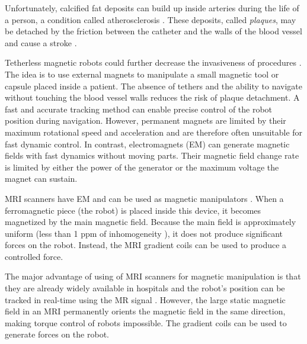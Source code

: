  
 Unfortunately, calcified fat deposits can build up inside arteries during the life of a person, a condition called atherosclerosis \cite{suri2010atherosclerosis}. 
 These deposits, called \emph{plaques}, may be detached by the friction between the catheter and the walls of the blood vessel and cause a stroke \cite{khatri2006ischemic,hamon2008periprocedural}.  
  \par
Tetherless magnetic robots could further decrease the invasiveness of procedures \cite{nelson2010microrobots}. 
The idea is to use external magnets to manipulate a small magnetic tool or capsule placed inside a patient. 
  The absence of tethers and the ability to navigate without touching the blood vessel walls \cite{kensicher2017towards} reduces the risk of plaque detachment. 
  A fast and accurate tracking method can enable precise control of the robot position during navigation. 
  However, permanent magnets are limited by their maximum rotational speed and acceleration and are therefore often unsuitable for fast dynamic control. 
 In contrast, electromagnets (EM) can generate magnetic fields with fast dynamics without moving parts. 
  Their magnetic field change rate is limited by either the power of the generator or the maximum voltage the magnet can sustain.
   \par
MRI scanners have EM and can be used as magnetic manipulators \cite{mathieu2006method, martel2007automatic, felfoul2016simultaneous}. 
 When a ferromagnetic piece (the robot) is placed inside this device, it becomes magnetized by the main magnetic field. 
  Because the main field is approximately uniform (less than 1 ppm of inhomogeneity \cite{wilson2002optimization}), it does not produce significant forces on the robot. 
  Instead, the MRI gradient coils can be used to produce a controlled force. 
 \par
The major advantage of using of MRI scanners for magnetic manipulation is that they are already widely available in hospitals and the robot's position can be tracked in real-time using the MR signal \cite{felfoul2009real, felfoul2016simultaneous}.
However, the large static magnetic field in an MRI permanently orients the magnetic field in the same direction, making torque control of robots impossible.
 The gradient coils can be used to generate forces on the robot.\par

